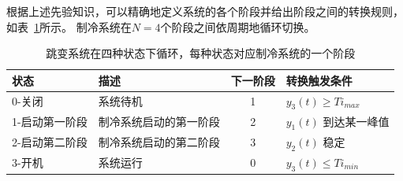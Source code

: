 根据上述先验知识，可以精确地定义系统的各个阶段并给出阶段之间的转换规则，如表~\ref{tab:cooling_dfa}所示。
制冷系统在$N=4$个阶段之间依周期地循环切换。
\begin{table}[]
    \centering
    \caption{跳变系统在四种状态下循环，每种状态对应制冷系统的一个阶段}
    \label{tab:cooling_dfa}
    \begin{tabular}{llcl}
    \toprule
       状态                  &    描述             & 下一阶段 & 转换触发条件                                   \\ 
       \hline
    0-关闭                       & 系统待机                             & 1          & $y_3(t)\geq Ti_{max}$                                \\
    1-启动第一阶段                      & 制冷系统启动的第一阶段                     & 2          & $y_1(t)$ 到达某一峰值                            \\
    2-启动第二阶段                       & 制冷系统启动的第二阶段 & 3          & \multicolumn{1}{l}{$y_2(t)$ 稳定} \\
    3-开机                       & 系统运行                                   & 0          & $y_3(t)\leq Ti_{min}$                                \\
    \bottomrule
    \end{tabular}
\end{table}


